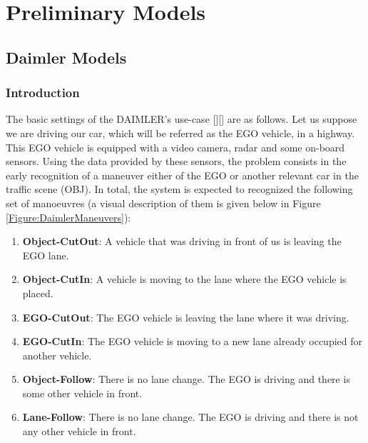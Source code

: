 \section{Preliminary Models}
\subsection{Daimler Models}

\subsubsection*{Introduction}

The basic settings of the DAIMLER's use-case [][] are as follows. Let us suppose we are driving our car, which will be referred as the EGO vehicle, in a highway. This EGO vehicle is equipped with a video camera, radar and some on-board sensors.  Using the data provided by these sensors, the problem consists in the early recognition of a maneuver either of the EGO or another relevant car in the traffic scene (OBJ). In total, the system is expected to recognized the following set of manoeuvres (a visual description of them is given below in Figure \ref{Figure:DaimlerManeuvers}):
\begin{enumerate}
\item \textbf{Object-CutOut}:  A vehicle that was driving in front of us is leaving the EGO lane.
\item \textbf{Object-CutIn}: A vehicle is moving to the lane where the EGO vehicle is placed.
\item \textbf{EGO-CutOut}: The EGO vehicle is leaving the lane where it was driving.
\item \textbf{EGO-CutIn}: The EGO vehicle is moving to a new lane already occupied for another vehicle. 
\item \textbf{Object-Follow}: There is no lane change. The EGO is driving and there is some other vehicle in front.
\item \textbf{Lane-Follow}: There is no lane change. The EGO is driving and there is not any other vehicle in front.
\end{enumerate}

